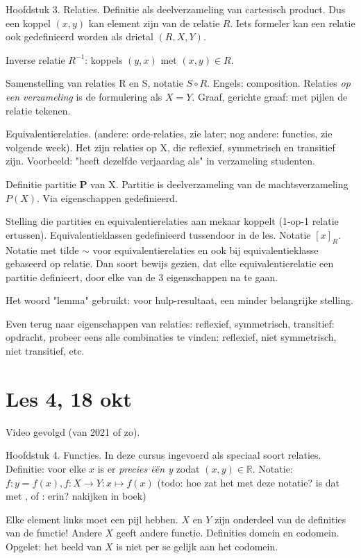 \documentclass{article}
\begin{document}
Hoofdstuk 3. Relaties. Definitie als deelverzameling van cartesisch product. Dus een koppel $(x,y)$ kan element zijn van de relatie $R$. Iets formeler kan een relatie ook gedefinieerd worden als drietal $(R,X,Y)$. 

Inverse relatie $R^{-1}$: koppels $(y,x)$ met $(x,y) \in R$. 

Samenstelling van relaties R en S, notatie $S \circ R$. Engels: composition. Relaties \emph{op een verzameling} is de formulering als $X=Y$. Graaf, gerichte graaf: met pijlen de relatie tekenen. 

Equivalentierelaties. (andere: orde-relaties, zie later; nog andere: functies, zie volgende week). Het zijn relaties op X, die reflexief, symmetrisch en transitief zijn. Voorbeeld: "heeft dezelfde verjaardag als" in verzameling studenten. 

Definitie partitie $\mathbf{P}$ van X. Partitie is deelverzameling van de machtsverzameling $P(X)$. Via eigenschappen gedefinieerd. 

Stelling die partities en equivalentierelaties aan mekaar koppelt (1-op-1 relatie ertussen). Equivalentieklassen gedefinieerd tussendoor in de les. Notatie $[x]_R$. Notatie met tilde $\sim$ voor equivalentierelaties en ook bij equivalentieklasse gebaseerd op relatie.  Dan soort bewijs gezien, dat elke equivalentierelatie een partitie definieert, door elke van de 3 eigenschappen na te gaan. 

Het woord "lemma" gebruikt: voor hulp-resultaat, een minder belangrijke stelling. 

Even terug naar eigenschappen van relaties: reflexief, symmetrisch, transitief: opdracht, probeer eens alle combinaties te vinden: reflexief, niet symmetrisch, niet transitief, etc. 


\section{Les 4, 18 okt}
Video gevolgd (van 2021 of zo). 

Hoofdstuk 4. Functies. In deze cursus ingevoerd als speciaal soort relaties. Definitie: voor elke $x$ is er \emph{precies \"e\"en y} zodat $(x,y) \in \mathbb{R}$. 
Notatie: $f: y=f(x), f:X \rightarrow  Y: x \mapsto f(x)$
(todo: hoe zat het met deze notatie? is dat met , of : erin? nakijken in boek) 

Elke element links moet een pijl hebben. $X$ en $Y$ zijn onderdeel van de definities van de functie! Andere $X$ geeft andere functie. 
Definities domein en codomein. Opgelet: het beeld van $X$ is niet per se gelijk aan het codomein. 
\end{document}
